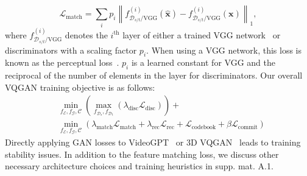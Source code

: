 $$
\mathcal{L}_\text{match}=\sum_{i} p_i \left\|f_{\mathcal{D}_{s / t}/\text{VGG}}^{(i)}(\mathbf{\hat{\mathbf{x}}})-f_{\mathcal{D}_{s / t}/\text{VGG}}^{(i)}\left(\mathbf{\mathbf{x}}\right)\right\|_{1},
$$
where $f_{\mathcal{D}_{s / t}/\text{VGG}}^{(i)}$ denotes the $i^\text{th}$ layer 
of either a trained VGG network~\cite{simonyan2014very} or discriminators with a scaling factor $p_i$. 
When using a VGG network, this loss is known as the perceptual loss~\cite{zhang2018unreasonable}. 
$p_i$ is a learned constant for VGG and the reciprocal of the number of elements in the layer for discriminators.
Our overall VQGAN training objective is as follows: 
$$
\begin{aligned}
    & \min _{f_\mathcal{E},f_\mathcal{G}, \mathcal{C}}\left(\max _{f_{\mathcal{D}_s}, f_{\mathcal{D}_t}}\left(\lambda_\text{disc} \mathcal{L}_\text{disc} \right)\right)+\\
    & \min _{f_\mathcal{E},f_\mathcal{G}, \mathcal{C}}\left(\lambda_\text{match} \mathcal{L}_\text{match}+\lambda_\text{rec} \mathcal{L}_\text{rec}+ \mathcal{L}_\text{codebook}+\beta\mathcal{L}_\text{commit}\right)
\end{aligned}
$$
Directly applying GAN losses to VideoGPT~\cite{yan2021videogpt} or 3D VQGAN~\cite{esser2021taming} leads to training stability issues. In addition to the feature matching loss, we discuss other necessary architecture choices and training heuristics in supp. mat. A.1.

